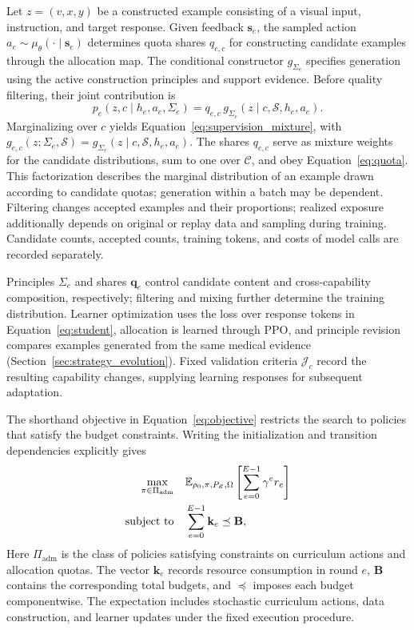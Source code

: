 Let $z=(v,x,y)$ be a constructed example consisting of a visual input, instruction, and target response. Given feedback $\mathbf{s}_e$, the sampled action $a_e\sim\mu_\theta(\cdot\mid \mathbf{s}_e)$ determines quota shares $q_{e,c}$ for constructing candidate examples through the allocation map. The conditional constructor $g_{\Sigma_e}$ specifies generation using the active construction principles and support evidence. Before quality filtering, their joint contribution is
\begin{equation}
p_e(z,c\mid h_e,a_e,\Sigma_e)
=q_{e,c}\,
g_{\Sigma_e}(z\mid c,\mathcal S,h_e,a_e).
\label{eq:factorization}
\end{equation}
Marginalizing over $c$ yields Equation~\ref{eq:supervision_mixture}, with $g_{e,c}(z;\Sigma_e,\mathcal S)=g_{\Sigma_e}(z\mid c,\mathcal S,h_e,a_e)$. The shares $q_{e,c}$ serve as mixture weights for the candidate distributions, sum to one over $\mathcal C$, and obey Equation~\ref{eq:quota}. This factorization describes the marginal distribution of an example drawn according to candidate quotas; generation within a batch may be dependent. Filtering changes accepted examples and their proportions; realized exposure additionally depends on original or replay data and sampling during training. Candidate counts, accepted counts, training tokens, and costs of model calls are recorded separately.

Principles $\Sigma_e$ and shares $\boldsymbol q_e$ control candidate content and cross-capability composition, respectively; filtering and mixing further determine the training distribution. Learner optimization uses the loss over response tokens in Equation~\ref{eq:student}, allocation is learned through PPO, and principle revision compares examples generated from the same medical evidence (Section~\ref{sec:strategy_evolution}). Fixed validation criteria $\mathcal J_c$ record the resulting capability changes, supplying learning responses for subsequent adaptation.

The shorthand objective in Equation~\ref{eq:objective} restricts the search to policies that satisfy the budget constraints. Writing the initialization and transition dependencies explicitly gives
\begin{equation}
\begin{aligned}
\max_{\pi\in\Pi_{\mathrm{adm}}}\quad&
\mathbb E_{\rho_0,\pi,P_{\mathscr E},\Omega}
\left[\sum_{e=0}^{E-1}\gamma^e r_e\right]\\
\text{subject to}\quad&
\sum_{e=0}^{E-1}\mathbf k_e\preceq\mathbf B ,
\end{aligned}
\label{eq:objective_full}
\end{equation}
Here $\Pi_{\mathrm{adm}}$ is the class of policies satisfying constraints on curriculum actions and allocation quotas. The vector $\mathbf k_e$ records resource consumption in round $e$, $\mathbf B$ contains the corresponding total budgets, and $\preceq$ imposes each budget componentwise. The expectation includes stochastic curriculum actions, data construction, and learner updates under the fixed execution procedure.

